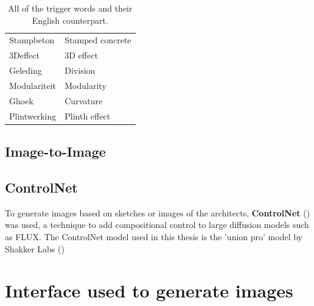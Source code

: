 \begin{table}[H]
    \centering
    \begin{tabular}{ll}
        \toprule
         Stampbeton & Stamped concrete\\
         3Deffect & 3D effect\\
         Geleding & Division \\
         Modulariteit & Modularity\\
         Ghoek & Curvature\\
         Plintwerking & Plinth effect\\
         \bottomrule
    \end{tabular}
    \caption{All of the trigger words and their English counterpart.}
    \label{tab:triggerwords}
\end{table}

\subsection{Image-to-Image}
\subsection{ControlNet}
To generate images based on sketches or images of the architects, \textbf{ControlNet} (\cite{zhang_adding_2023}) was used, a technique to add compositional control to large diffusion models such as FLUX. The ControlNet model used in this thesis is the 'union pro' model by Shakker Labs (\href{}{})
\section{Interface used to generate images} \label{sec:Workflow used to generate images}
